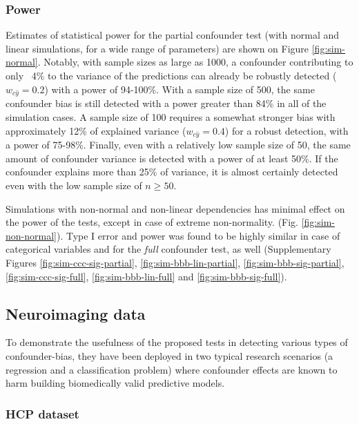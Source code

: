 \documentclass{article}
\begin{document}
\subsubsection*{Power}

Estimates of statistical power for the partial confounder test (with normal and linear simulations, for  a wide range of parameters) are shown on Figure \ref{fig:sim-normal}. Notably, with sample sizes as large as 1000, a confounder contributing to only ~4\% to the variance of the predictions can already be robustly detected ($w_{c\hat{y}} = 0.2$) with a power of 94-100\%. With a sample size of 500, the same confounder bias is still detected with a power greater than 84\% in all of the simulation cases. A sample size of 100 requires a somewhat stronger bias with approximately 12\% of explained variance ($w_{c\hat{y}}=0.4$) for a robust detection, with a power of 75-98\%. Finally, even with a relatively low sample size of 50, the same amount of confounder variance is detected with a power of at least 50\%. If the confounder explains more than 25\% of variance, it is almost certainly detected even with the low sample size of $n \geq 50$.

Simulations with non-normal and non-linear dependencies has minimal effect on the power of the tests, except in case of extreme non-normality. (Fig. \ref{fig:sim-non-normal}).
Type I error and power was found to be highly similar in case of categorical variables and for the \emph{full} confounder test, as well (Supplementary Figures \ref{fig:sim-ccc-sig-partial}, \ref{fig:sim-bbb-lin-partial}, \ref{fig:sim-bbb-sig-partial}, \ref{fig:sim-ccc-sig-full}, \ref{fig:sim-bbb-lin-full} and \ref{fig:sim-bbb-sig-full}).


\subsection{Neuroimaging data}

To demonstrate the usefulness of the proposed tests in detecting various types of confounder-bias, they have been deployed in two typical research scenarios (a regression and a classification problem) where confounder effects are known to harm building biomedically valid predictive models. 

\subsubsection*{HCP dataset}
\end{document}
